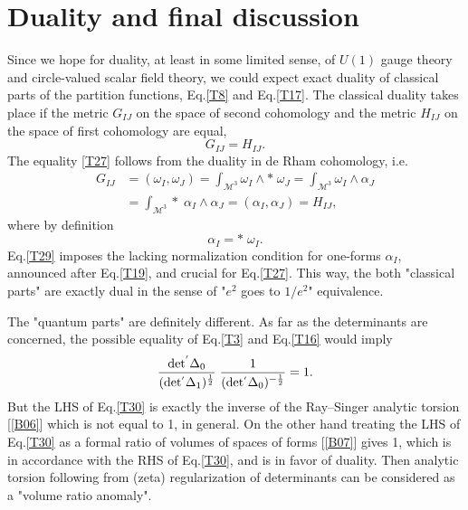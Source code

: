 \documentclass[a4paper,12pt]{article}
\begin{document}
\section{Duality and final discussion}

Since we hope for duality, at least in some limited sense, of $U(1)$ gauge
theory and circle-valued scalar field theory, we could expect
exact duality of classical parts of the partition functions,
Eq.\eqref{T8} and Eq.\eqref{T17}. The classical duality takes place if the metric
$G_{IJ}$ on the space of second cohomology and the metric $H_{IJ}$
on the space of first cohomology are equal,
\begin{equation}\label{T27}
G_{IJ}=H_{IJ}.
\end{equation}
The equality \eqref{T27} follows from the duality in de Rham cohomology, i.e.
\begin{equation}
\begin{split}
\label{T28} G_{IJ}&=(\omega_{I}, \omega_{J})=
\int_{\mathcal{M}^{3}} \omega_{I} \wedge \ast\; \omega_{J}=
\int_{\mathcal{M}^{3}}
\omega_{I} \wedge \alpha_{J}\\
&= \int_{\mathcal{M}^{3}} \ast \; \alpha_{I} \wedge \alpha_{J}=
(\alpha_{I}, \alpha_{J})=H_{IJ},
\end{split}
\end{equation}
where by definition
\begin{equation}\label{T29}
\alpha_{I} = \ast \; \omega_{I}.
\end{equation}
Eq.\eqref{T29} imposes the lacking normalization condition for
one-forms $\alpha_{I}$, announced after Eq.\eqref{T19}, and crucial
for Eq.\eqref{T27}. This way, the both "classical parts" are
exactly dual in the sense of "$e^{2}$ goes to $1/{e^{2}}$"
equivalence.

The "quantum parts" are definitely different. As far as the
determinants are concerned, the possible equality of Eq.\eqref{T3}
and Eq.\eqref{T16} would imply
\begin{equation}\label{T30}
\frac{\rm det^{'} \Delta_{0} }
{(\rm det^{'}\Delta_{1})^\frac{1}{2} }\;
\frac{1}{ (\rm det^{'}\Delta_{0})^{- \frac{1}{2} }}=1.
\end{equation}
But the LHS of Eq.\eqref{T30} is exactly the inverse of the
Ray--Singer analytic torsion [\ref{B06}] which is not equal to 1,
in general. On the other hand treating the LHS of Eq.\eqref{T30}
as a formal ratio of volumes of spaces of forms [\ref{B07}] gives
1, which is in  accordance with the RHS of Eq.\eqref{T30}, and is in favor of duality. Then
analytic torsion following from (zeta) regularization of
determinants can be considered as a "volume ratio anomaly".
\end{document}
